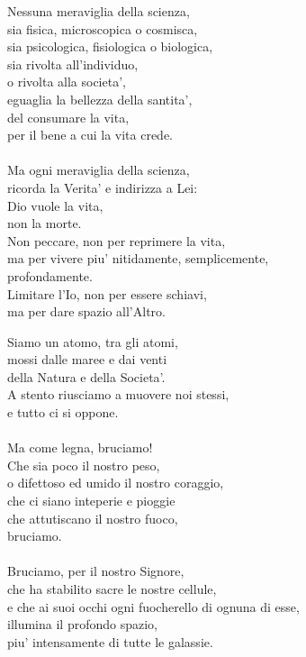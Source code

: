 \begin{haiku}
    Nessuna meraviglia della scienza,\\
    sia fisica, microscopica o cosmisca,\\
    sia psicologica, fisiologica o biologica,\\
    sia rivolta all'individuo, \\
    \hspace{1cm} o rivolta alla societa',\\
    eguaglia la bellezza della santita',\\
    del consumare la vita,\\
    per il bene a cui la vita crede.\\
    \leavevmode\\
    Ma ogni meraviglia della scienza,\\
    ricorda la Verita' e indirizza a Lei:\\
    \hspace{1cm} Dio vuole la vita,\\
    \hspace{1cm} non la morte.\\
    Non peccare, non per reprimere la vita,\\
    ma per vivere piu' nitidamente, semplicemente,\\
    profondamente.\\
    Limitare l'Io, non per essere schiavi,\\
    ma per dare spazio all'Altro.\\
\end{haiku}


\begin{haiku}
    Siamo un atomo, tra gli atomi,\\
    mossi dalle maree e dai venti \\
    della Natura e della Societa'.\\
    A stento riusciamo a muovere noi stessi,\\
    e tutto ci si oppone.\\
    \leavevmode\\
    Ma come legna, bruciamo!\\
    Che sia poco il nostro peso,\\
    o difettoso ed umido il nostro coraggio,\\
    che ci siano inteperie e pioggie\\
    che attutiscano il nostro fuoco,\\
    bruciamo.\\
    \leavevmode\\
    Bruciamo, per il nostro Signore,\\
    che ha stabilito sacre le nostre cellule,\\
    e che ai suoi occhi ogni fuocherello di ognuna di esse,\\
    illumina il profondo spazio,\\
    piu' intensamente di tutte le galassie.\\
\end{haiku}

